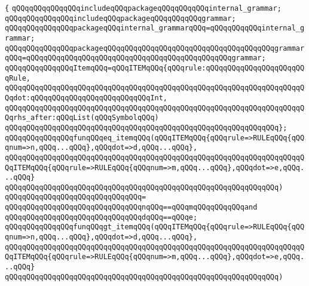 \verb|{|\newline
\verb|qQQqqQQqqQQqqQQqincludeqQQqpackageqQQqqQQqqQQqinternal_grammar;|\newline
\verb|qQQqqQQqqQQqqQQqincludeqQQqpackageqQQqqQQqqQQqgrammar;|\newline
\newline
\verb|qQQqqQQqqQQqqQQqpackageqQQqinternal_grammarqQQq=qQQqqQQqqQQqinternal_grammar;|\newline
\verb|qQQqqQQqqQQqqQQqpackageqQQqqQQqqQQqqQQqqQQqqQQqqQQqqQQqqQQqqQQqgrammarqQQq=qQQqqQQqqQQqqQQqqQQqqQQqqQQqqQQqqQQqqQQqqQQqqQQqgrammar;|\newline
\newline
\verb|qQQqqQQqqQQqqQQqItemqQQq=qQQqITEMqQQq{qQQqrule:qQQqqQQqqQQqqQQqqQQqqQQqRule,|\newline
\verb|qQQqqQQqqQQqqQQqqQQqqQQqqQQqqQQqqQQqqQQqqQQqqQQqqQQqqQQqqQQqqQQqqQQqqQQqdot:qQQqqQQqqQQqqQQqqQQqqQQqqQQqInt,|\newline
\verb|qQQqqQQqqQQqqQQqqQQqqQQqqQQqqQQqqQQqqQQqqQQqqQQqqQQqqQQqqQQqqQQqqQQqqQQqrhs_after:qQQqList(qQQqSymbolqQQq)|\newline
\verb|qQQqqQQqqQQqqQQqqQQqqQQqqQQqqQQqqQQqqQQqqQQqqQQqqQQqqQQqqQQqqQQq};|\newline
\newline
\verb|qQQqqQQqqQQqqQQqfunqQQqeq_itemqQQq(qQQqITEMqQQq{qQQqrule=>RULEqQQq{qQQqnum=>n,qQQq...qQQq},qQQqdot=>d,qQQq...qQQq},|\newline
\verb|qQQqqQQqqQQqqQQqqQQqqQQqqQQqqQQqqQQqqQQqqQQqqQQqqQQqqQQqqQQqqQQqqQQqqQQqITEMqQQq{qQQqrule=>RULEqQQq{qQQqnum=>m,qQQq...qQQq},qQQqdot=>e,qQQq...qQQq}|\newline
\verb|qQQqqQQqqQQqqQQqqQQqqQQqqQQqqQQqqQQqqQQqqQQqqQQqqQQqqQQqqQQqqQQq)|\newline
\verb|qQQqqQQqqQQqqQQqqQQqqQQqqQQqqQQq=|\newline
\verb|qQQqqQQqqQQqqQQqqQQqqQQqqQQqqQQqnqQQq==qQQqmqQQqqQQqqQQqand|\newline
\verb|qQQqqQQqqQQqqQQqqQQqqQQqqQQqqQQqdqQQq==qQQqe;|\newline
\newline
\verb|qQQqqQQqqQQqqQQqfunqQQqgt_itemqQQq(qQQqITEMqQQq{qQQqrule=>RULEqQQq{qQQqnum=>n,qQQq...qQQq},qQQqdot=>d,qQQq...qQQq},|\newline
\verb|qQQqqQQqqQQqqQQqqQQqqQQqqQQqqQQqqQQqqQQqqQQqqQQqqQQqqQQqqQQqqQQqqQQqqQQqITEMqQQq{qQQqrule=>RULEqQQq{qQQqnum=>m,qQQq...qQQq},qQQqdot=>e,qQQq...qQQq}|\newline
\verb|qQQqqQQqqQQqqQQqqQQqqQQqqQQqqQQqqQQqqQQqqQQqqQQqqQQqqQQqqQQqqQQq)|\newline
